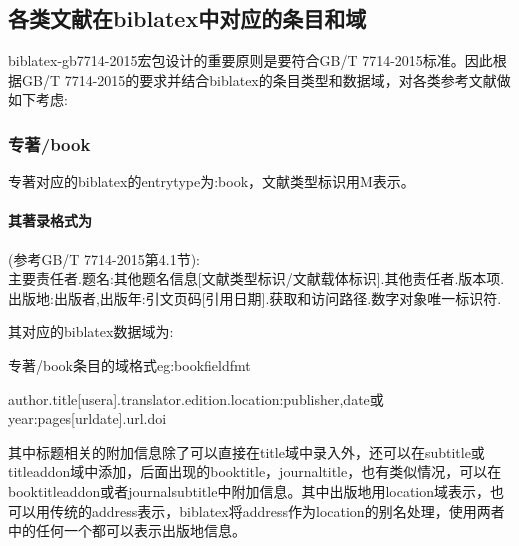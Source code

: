 

\subsection{各类文献在biblatex中对应的条目和域}\label{sec:numeric:data}
biblatex-gb7714-2015宏包设计的重要原则是要符合GB/T 7714-2015标准。因此根据GB/T 7714-2015的要求并结合biblatex的条目类型和数据域，对各类参考文献做如下考虑:
\subsubsection{专著/book}
\begin{refentry}{}{}
专著对应的biblatex的entrytype为:book，文献类型标识用M表示。

\paragraph{其著录格式为}(参考GB/T 7714-2015第4.1节):\\
主要责任者.题名:其他题名信息[文献类型标识/文献载体标识].其他责任者.版本项.出版地:出版者,出版年:引文页码[引用日期].获取和访问路径.数字对象唯一标识符.
\end{refentry}

其对应的biblatex数据域为:
\begin{example}{专著/book条目的域格式}{eg:bookfieldfmt}
\begin{texlist}
author.title[usera].translator.edition.location:publisher,date或year:pages[urldate].url.doi
\end{texlist}
\end{example}

其中标题相关的附加信息除了可以直接在title域中录入外，还可以在subtitle或titleaddon域中添加，后面出现的booktitle，journaltitle，也有类似情况，可以在booktitleaddon或者journalsubtitle中附加信息。其中出版地用location域表示，也可以用传统的address表示，biblatex将address作为location的别名处理，使用两者中的任何一个都可以表示出版地信息。

